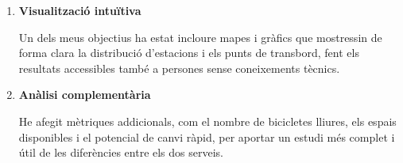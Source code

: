 \begin{enumerate}
\begin{enumerate}
        \item \textbf{Visualització intuïtiva}

        Un dels meus objectius ha estat incloure mapes i gràfics que mostressin de forma clara la distribució
        d’estacions i els punts de transbord, fent els resultats accessibles també a persones sense coneixements tècnics.

        \item \textbf{Anàlisi complementària}

        He afegit mètriques addicionals, com el nombre de bicicletes lliures, els espais disponibles i
        el potencial de canvi ràpid, per aportar un estudi més complet i útil de les diferències entre els dos serveis.
    \end{enumerate}
\end{enumerate}
